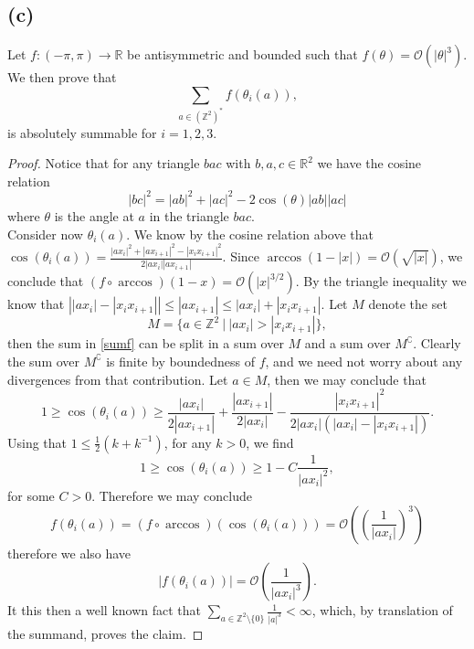 \documentclass[a4paper,11pt]{article}
\newcommand{\abs}[1]{\left\lvert #1 \right\rvert}
\newcommand{\R}{\mathbb{R}}
\newcommand{\Z}{\mathbb{Z}}
\numberwithin{equation}{section}
\begin{document}
	\subsection*{(c)}
	Let $ f:(-\pi,\pi)\to\R $ be antisymmetric and bounded such that $ f(\theta)=\mathcal{O}(\abs{\theta}^3) $. We then prove that \begin{equation}
	\sum_{a\in(\Z^2)^*}f(\theta_i(a)),\label{sumf}
	\end{equation}
	is absolutely summable for $ i=1,2,3 $. \begin{proof}
		Notice that for any triangle $ bac $ with $ b,a,c\in\R^2 $ we have the cosine relation\begin{equation}
		\abs{bc}^2=\abs{ab}^2+\abs{ac}^2-2\cos(\theta)\abs{ab}\abs{ac}
		\end{equation}
	where $ \theta $ is the angle at $ a $ in the triangle $ bac $. \\
	Consider now $ \theta_i(a) $. We know by the cosine relation above that $ \cos(\theta_i(a))=\frac{\abs{ax_i}^2+\abs{ax_{i+1}}^2-\abs{x_ix_{i+1}}^2}{2\abs{ax_i}\abs{ax_{i+1}}} $. Since $ \arccos(1-\abs{x})=\mathcal{O}(\sqrt{\abs{x}}) $, we conclude that $ (f\circ\arccos)(1-x)=\mathcal{O}(\abs{x}^{3/2}) $. By the triangle inequality we know that $ \abs{\abs{ax_i}-\abs{x_ix_{i+1}}}\leq\abs{ax_{i+1}}\leq\abs{ax_i}+\abs{x_ix_{i+1}} $. Let $ M $ denote the set \begin{equation}
	M=\{a\in\Z^2\ \vert\ \abs{ax_i}>\abs{x_ix_{i+1}}\},
	\end{equation} then the sum in \eqref{sumf} can be split in a sum over $ M $ and a sum over $ M^\complement $. Clearly the sum over $ M^\complement $ is finite by boundedness of $ f $, and we need not worry about any divergences from that contribution. Let $ a\in M $, then we may conclude that \begin{equation}
	1\geq\cos(\theta_i(a))\geq\frac{\abs{ax_i}}{2\abs{ax_{i+1}}}+\frac{\abs{ax_{i+1}}}{2\abs{ax_i}}-\frac{\abs{x_ix_{i+1}}^2}{2\abs{ax_i}(\abs{ax_i}-\abs{x_ix_{i+1}})}.
	\end{equation}
	Using that $ 1\leq\frac{1}{2}\left(k+k^{-1}\right) $, for any $k>0$,
	 we find \begin{equation}
	1\geq\cos(\theta_i(a))\geq1-C\frac{1}{\abs{ax_i}^2},
	\end{equation}
	for some $ C>0 $. Therefore we may conclude\begin{equation}
	f(\theta_i(a))=(f\circ\arccos)(\cos(\theta_i(a)))=\mathcal{O}\left(\left(\frac{1}{\abs{ax_i}}\right)^3\right)
	\end{equation}
	therefore we also have \begin{equation}
	\abs{f(\theta_i(a))}=\mathcal{O}\left(\frac{1}{\abs{ax_i}^3}\right).
	\end{equation}
	It this then a well known fact that $ \sum_{a\in\Z^2\setminus\{0\}}\frac{1}{\abs{a}^3}<\infty $, which, by translation of the summand, proves the claim.
\end{proof}
\end{document}
